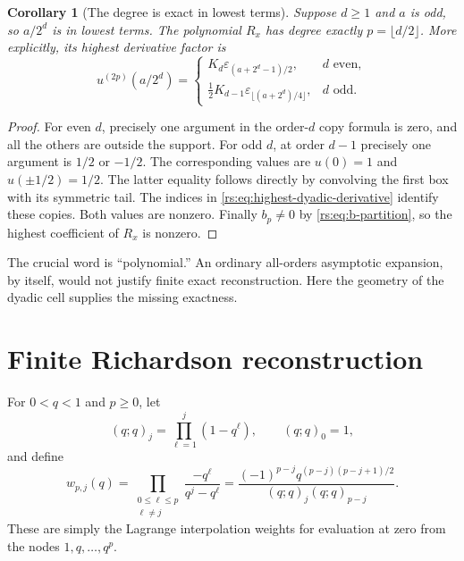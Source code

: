 \documentclass[11pt,a4paper,oneside,openany]{book}
\numberwithin{equation}{chapter}
\newtheorem{corollary}[theorem]{Corollary}
\theoremstyle{definition}
\theoremstyle{remark}
\newcommand{\eps}{\varepsilon}
\begin{document}
\begin{corollary}[The degree is exact in lowest terms]\label{rs:cor:exact-degree}
Suppose $d\geq1$ and $a$ is odd, so $a/2^d$ is in lowest terms.
The polynomial $R_x$ has degree exactly $p=\lfloor d/2\rfloor$.
More explicitly, its highest derivative factor is
\begin{equation}
 u^{(2p)}(a/2^d)=
 \begin{cases}
 K_d\eps_{(a+2^d-1)/2},&d\text{ even},\\[3pt]
 \frac12K_{d-1}\eps_{\lfloor(a+2^d)/4\rfloor},&d\text{ odd}.
 \end{cases}
 \label{rs:eq:highest-dyadic-derivative}
\end{equation}
\end{corollary}
\begin{proof}
For even $d$, precisely one argument in the order-$d$ copy formula
is zero, and all the others are outside the support. For odd $d$,
at order $d-1$ precisely one argument is $1/2$ or $-1/2$.
The corresponding values are $u(0)=1$ and $u(\pm1/2)=1/2$.
The latter equality follows directly by convolving the first box
with its symmetric tail. The indices in
\eqref{rs:eq:highest-dyadic-derivative} identify these copies. Both
values are nonzero. Finally $b_p\ne0$ by
\eqref{rs:eq:b-partition}, so the highest coefficient of $R_x$
is nonzero.
\end{proof}

The crucial word is ``polynomial.'' An ordinary all-orders asymptotic
expansion, by itself, would not justify finite exact reconstruction.
Here the geometry of the dyadic cell supplies the missing exactness.

\section{Finite Richardson reconstruction}

For $0<q<1$ and $p\geq0$, let
\begin{equation}
 (q;q)_j=\prod_{\ell=1}^j(1-q^\ell),\qquad(q;q)_0=1,
\end{equation}
and define
\begin{equation}
 w_{p,j}(q)=
 \prod_{\substack{0\leq\ell\leq p\\\ell\ne j}}
       \frac{-q^\ell}{q^j-q^\ell}
 =\frac{(-1)^{p-j}q^{(p-j)(p-j+1)/2}}
       {(q;q)_j(q;q)_{p-j}}.
 \label{rs:eq:qweights}
\end{equation}
These are simply the Lagrange interpolation weights for evaluation
at zero from the nodes $1,q,\ldots,q^p$.
\end{document}
